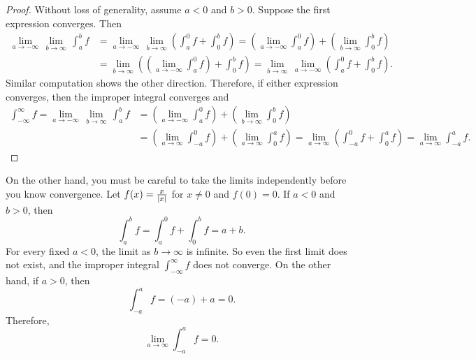 \begin{proof}
Without loss of generality, assume $a < 0$ and $b > 0$.  Suppose
the first expression converges.  Then
\begin{equation*}
\begin{split}
\lim_{a \to -\infty} \, \lim_{b \to \infty} \, \int_a^b f
& =
\lim_{a \to -\infty} \, \lim_{b \to \infty}
\left(
\int_a^0 f
+
\int_0^b f
\right)
=
\left(
\lim_{a \to -\infty}
\int_a^0 f
\right)
+
\left(
 \lim_{b \to \infty}
\int_0^b f
\right) \\
& = 
 \lim_{b \to \infty}
\left(
\left(
\lim_{a \to -\infty}
\int_a^0 f
\right) 
+
\int_0^b f
\right)
=
 \lim_{b \to \infty} \,
\lim_{a \to -\infty}
\left(
\int_a^0 f
+
\int_0^b f
\right)  .
\end{split}
\end{equation*}
Similar computation shows the other direction.  Therefore, if
either expression converges, then the improper integral converges
and
\begin{equation*}
\begin{split}
\int_{-\infty}^\infty f
=
\lim_{a \to -\infty} \, \lim_{b \to \infty} \, \int_a^b f
& =
\left(
\lim_{a \to -\infty}
\int_a^0 f
\right)
+
\left(
 \lim_{b \to \infty}
\int_0^b f
\right)
\\
& =
\left(
\lim_{a \to \infty}
\int_{-a}^0 f
\right)
+
\left(
 \lim_{a \to \infty}
\int_0^a f
\right)
=
\lim_{a \to \infty}
\left(
\int_{-a}^0 f
+
\int_0^a f
\right)
=
\lim_{a \to \infty}
\int_{-a}^a f .
\end{split}
\end{equation*}
\end{proof}

\begin{example}
On the other hand, you must be careful to
take the limits independently before you know convergence.  Let
$f(x) = \frac{x}{\left\lvert {x} \right\rvert}$ for $x \not= 0$ and $f(0) = 0$.
If $a < 0$ and $b > 0$, then
\begin{equation*}
\int_{a}^b f
=
\int_{a}^0 f
+
\int_{0}^b f
=
a+b .
\end{equation*}
For every fixed $a < 0$, the limit as $b \to \infty$ is infinite.
So even the first limit does not exist,
and the improper integral $\int_{-\infty}^\infty f$ does not converge.
On the other hand, if $a > 0$, then
\begin{equation*}
\int_{-a}^{a} f
=
(-a)+a = 0 .
\end{equation*}
Therefore,
\begin{equation*}
\lim_{a\to\infty}
\int_{-a}^{a} f
= 0 .
\end{equation*}
\end{example}

